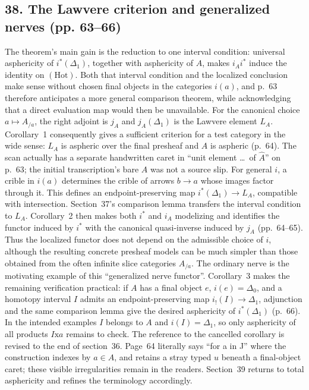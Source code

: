 \documentclass[10pt,oneside]{book}
\begin{document}
\subsection*{38. The Lawvere criterion and generalized nerves (pp. 63--66)}
The theorem's main gain is the reduction to one interval condition: universal asphericity of $i^*(\Delta_1)$, together with asphericity of $A$, makes $i_Ai^*$ induce the identity on $(\mathrm{Hot})$. Both that interval condition and the localized conclusion make sense without chosen final objects in the categories $i(a)$, and p.~63 therefore anticipates a more general comparison theorem, while acknowledging that a direct evaluation map would then be unavailable. For the canonical choice $a\mapsto A_{/a}$, the right adjoint is $j_A$ and $j_A(\Delta_1)$ is the Lawvere element $L_A$. Corollary~1 consequently gives a sufficient criterion for a test category in the wide sense: $L_A$ is aspheric over the final presheaf and $A$ is aspheric (p.~64). The scan actually has a separate handwritten caret in ``unit element \ldots\ of $\widehat A$'' on p.~63; the initial transcription's bare $A$ was not a source slip. For general $i$, a crible in $i(a)$ determines the crible of arrows $b\to a$ whose images factor through it. This defines an endpoint-preserving map $i^*(\Delta_1)\to L_A$, compatible with intersection. Section~37's comparison lemma transfers the interval condition to $L_A$. Corollary~2 then makes both $i^*$ and $i_A$ modelizing and identifies the functor induced by $i^*$ with the canonical quasi-inverse induced by $j_A$ (pp.~64--65). Thus the localized functor does not depend on the admissible choice of $i$, although the resulting concrete presheaf models can be much simpler than those obtained from the often infinite slice categories $A_{/a}$. The ordinary nerve is the motivating example of this ``generalized nerve functor''. Corollary~3 makes the remaining verification practical: if $A$ has a final object $e$, $i(e)=\Delta_0$, and a homotopy interval $I$ admits an endpoint-preserving map $i_!(I)\to\Delta_1$, adjunction and the same comparison lemma give the desired asphericity of $i^*(\Delta_1)$ (p.~66). In the intended examples $I$ belongs to $A$ and $i(I)=\Delta_1$, so only asphericity of all products $I\mathrm{x}a$ remains to check. The reference to the cancelled corollary is revised to the end of section~36. Page~64 literally says ``for a in J'' where the construction indexes by $a\in A$, and retains a stray typed $u$ beneath a final-object caret; these visible irregularities remain in the readers. Section~39 returns to total asphericity and refines the terminology accordingly.
\end{document}
